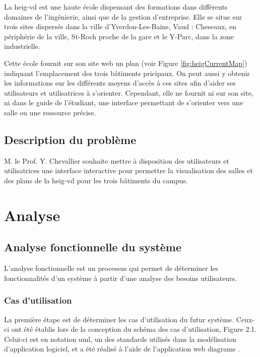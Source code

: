 \documentclass[
    iai, %
    il, %
]{heig-tb}
\begin{document}
La \gls{heig-vd} est une haute école dispensant des formations dans différents domaines de l'ingénierie, ainsi que de la gestion d'entreprise.
Elle se situe sur trois sites dispersés dans la ville d'Yverdon-Les-Bains, Vaud
: Cheseaux, en périphérie de la ville, St-Roch proche de la gare et le Y-Parc, dans la zone industrielle.

Cette école fournit sur son site web un plan \cite{plan-heig} (voir Figure \ref{fig:heigCurrentMap}) indiquant l'emplacement des trois bâtiments pricipaux.
On peut aussi y obtenir les informations sur les différents moyens d'accès à ces sites afin d'aider ses utilisateurs et  utilisatrices à s'orienter.
Cependant, elle ne fournit ni sur son site, ni dans le guide de l'étudiant, une interface permettant de s'orienter vers une salle ou une ressource précise.

\section{Description du problème}
M. le Prof. Y. Chevallier souhaite mettre à disposition des utilisateurs et utilisatrices une interface interactive pour permettre la visualisation des salles et des plans de la \gls{heig-vd} pour les trois bâtiments du campus.

\chapter{Analyse}
\section{Analyse fonctionnelle du système}
L'analyse fonctionnelle est un processus qui permet de déterminer les fonctionnalités d'un système à partir d'une analyse des besoins utilisateurs.

\subsection{Cas d'utilisation}
La première étape est de déterminer les cas d'utilisation du futur système.
Ceux-ci ont été établis lors de la conception du schéma des cas d'utilisation, Figure 2.1.
Celui-ci est en notation \gls{uml}, un des standards utilisés dans la modélisation d'application logiciel,
et a été réalisé à l'aide de l'application web \gls{diagrams} \cite{diagrams}.

\end{document}
